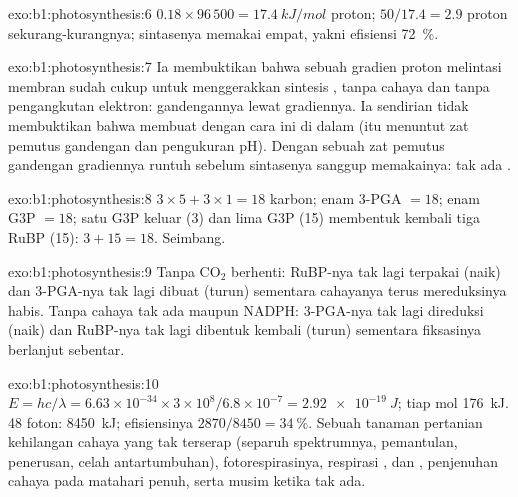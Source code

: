 \begin{solution}{exo:b1:photosynthesis:6}
$0.18\times 96\,500 = \qty{17.4}{kJ/mol}$ proton; $50/17.4 = 2.9$
proton sekurang-kurangnya; sintasenya memakai empat, yakni efisiensi
\qty{72}{\%}.
\end{solution}

\begin{solution}{exo:b1:photosynthesis:7}
Ia membuktikan bahwa sebuah gradien proton melintasi membran 
sudah cukup untuk menggerakkan sintesis , tanpa cahaya dan tanpa
pengangkutan elektron: gandengannya lewat gradiennya. Ia sendirian
tidak membuktikan bahwa  membuat  dengan cara ini di
dalam  (itu menuntut zat pemutus gandengan dan pengukuran pH).
Dengan sebuah zat pemutus gandengan gradiennya runtuh sebelum sintasenya
sanggup memakainya: tak ada .
\end{solution}

\begin{solution}{exo:b1:photosynthesis:8}
$3\times 5 + 3\times 1 = 18$ karbon; enam 3-PGA $= 18$; enam G3P $= 18$;
satu G3P keluar (3) dan lima G3P (15) membentuk kembali tiga RuBP (15):
$3 +
15 = 18$. Seimbang.
\end{solution}

\begin{solution}{exo:b1:photosynthesis:9}
Tanpa $\mathrm{CO_2}$  berhenti: RuBP-nya tak lagi terpakai
(naik) dan 3-PGA-nya tak lagi dibuat (turun) sementara cahayanya terus
mereduksinya habis. Tanpa cahaya tak ada  maupun NADPH: 3-PGA-nya
tak lagi direduksi (naik) dan RuBP-nya tak lagi dibentuk kembali
(turun) sementara fiksasinya berlanjut sebentar.
\end{solution}

\begin{solution}{exo:b1:photosynthesis:10}
$E = hc/\lambda = 6.63\times 10^{-34}\times 3\times 10^8/6.8\times
10^{-7} = \qty{2.92e-19}{J}$; tiap mol \qty{176}{kJ}. 48 foton:
\qty{8450}{kJ}; efisiensinya $2870/8450 = \qty{34}{\%}$. Sebuah tanaman
pertanian kehilangan cahaya yang tak terserap (separuh spektrumnya,
pemantulan, penerusan, celah antartumbuhan), fotorespirasinya,
respirasi ,  dan , penjenuhan cahaya  pada
matahari penuh, serta musim ketika  tak ada.
\end{solution}

